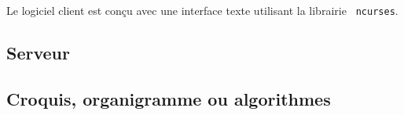 \documentclass[12pt,french]{article}
\begin{document}










            Le logiciel client est conçu avec une interface texte utilisant la librairie {\tt
            ncurses}. 

        \subsection{Serveur} %
        \label{sub:serveur}


        \subsection{Croquis, organigramme ou algorithmes} %
        \label{sub:croquis-org-algo}
\end{document}

